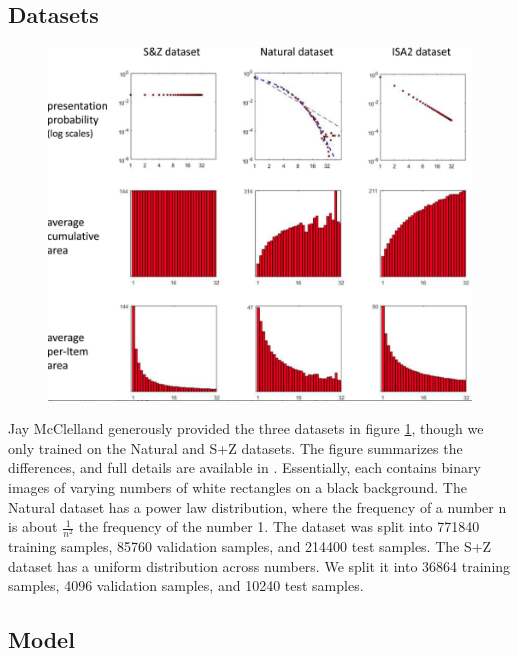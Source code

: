 \documentclass{article}
\begin{document}
\subsection{Datasets}
\begin{figure}[ht]
\begin{center}
\includegraphics[scale=.38,width=0.3\linewidth]{dataset.png}
\caption{}
\label{dataset}
\end{center}
\end{figure}
Jay McClelland generously provided the three datasets in figure \ref{dataset}, though we only trained on the Natural and S+Z datasets. The figure summarizes the differences, and full details are available in \cite{competence}. Essentially, each contains binary images of varying numbers of white rectangles on a black background. The Natural dataset has a power law distribution, where the frequency of a number n is about $\frac{1}{n^2}$ the frequency of the number 1. The dataset was split into 771840 training samples, 85760 validation samples, and 214400 test samples. The S+Z dataset has a uniform distribution across numbers. We split it into 36864 training samples, 4096 validation samples, and 10240 test samples.

\subsection{Model}
\end{document}
